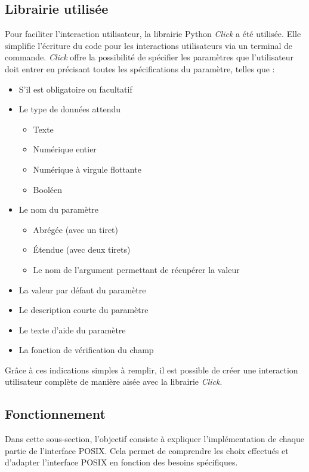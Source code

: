 \subsection{Librairie utilisée}

Pour faciliter l'interaction utilisateur, la librairie Python \textit{Click} a été utilisée.
Elle simplifie l'écriture du code pour les interactions utilisateurs via un terminal de commande.
\textit{Click} offre la possibilité de spécifier les paramètres que l'utilisateur doit entrer en précisant toutes les spécifications du paramètre, telles que :

\begin{itemize}
    \item S'il est obligatoire ou facultatif
    \item Le type de données attendu
    \begin{itemize}
        \item Texte
        \item Numérique entier
        \item Numérique à virgule flottante
        \item Booléen
    \end{itemize}
    \item Le nom du paramètre
    \begin{itemize}
        \item Abrégée (avec un tiret)
        \item Étendue (avec deux tirets)
        \item Le nom de l'argument permettant de récupérer la valeur
    \end{itemize}
    \item La valeur par défaut du paramètre
    \item Le description courte du paramètre
    \item Le texte d'aide du paramètre
    \item La fonction de vérification du champ
\end{itemize}

Grâce à ces indications simples à remplir, il est possible de créer une interaction utilisateur complète de manière aisée avec la librairie \textit{Click}.

\subsection{Fonctionnement}

Dans cette sous-section, l'objectif consiste à expliquer l'implémentation de chaque partie de l'interface POSIX.
Cela permet de comprendre les choix effectués et d'adapter l'interface POSIX en fonction des besoins spécifiques.


